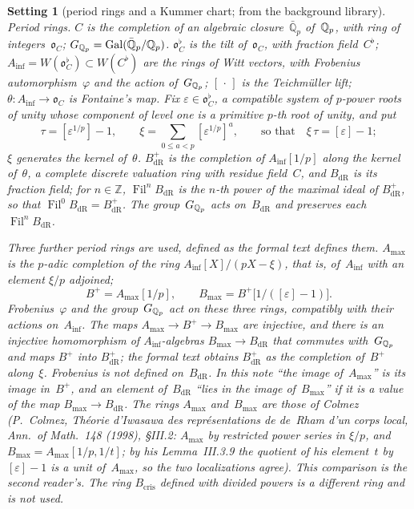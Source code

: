 \documentclass[11pt,a4paper]{article}
\newcommand{\m}[1]{\mbox{$#1$}}        %
\theoremstyle{plainx}
\theoremstyle{uprightx}
\newtheorem{setting}[theorem]{Setting}          %
\providecommand{\Ainf}{A_{\inf}}\providecommand{\WC}{W(C^{\flat})}\providecommand{\BdR}{B_{\mathrm{dR}}}
\providecommand{\Fil}{\operatorname{Fil}}\providecommand{\fS}{\mathfrak{S}}\providecommand{\cE}{\mathcal{E}}
\begin{document}
\begin{setting}[period rings and a Kummer chart; from the background library]\label{set:rings}
\emph{Period rings.} $C$ is the completion of an algebraic closure~$\bar{\mathbb{Q}}_p$ of~$\mathbb{Q}_p$, with ring of
integers~$\mathfrak{o}_C$; $G_{\mathbb{Q}_p}=\mathrm{Gal}(\bar{\mathbb{Q}}_p/\mathbb{Q}_p)$. $\mathfrak{o}_C^\flat$ is the tilt
of~$\mathfrak{o}_C$, with fraction field~$C^\flat$; $\Ainf=W(\mathfrak{o}_C^\flat)\subset\WC$ are the rings of Witt
vectors, with Frobenius automorphism~$\varphi$ and the action of~$G_{\mathbb{Q}_p}$; $[\,\cdot\,]$ is the Teichmüller lift;
$\theta\colon\Ainf\to\mathfrak{o}_C$ is Fontaine's map. Fix $\varepsilon\in\mathfrak{o}_C^\flat$, a compatible
system of $p$-power roots of unity whose component of level one is a primitive $p$-th root of unity, and put
\[\tau=[\varepsilon^{1/p}]-1,\qquad \xi=\sum_{0\le a<p}[\varepsilon^{1/p}]^{a},\qquad\text{so that}\quad
\xi\,\tau=[\varepsilon]-1 ;\]
$\xi$ generates the kernel of~$\theta$. $B^+_{\mathrm{dR}}$ is the completion of \m{\Ainf[1/p]} along the kernel
of~$\theta$, a complete discrete valuation ring with residue field~$C$, and $\BdR$ is its fraction field; for
\m{n\in\mathbb{Z}}, \m{\Fil^{n}\BdR} is the $n$-th power of the maximal ideal of $B^+_{\mathrm{dR}}$, so that
\m{\Fil^{0}\BdR=B^+_{\mathrm{dR}}}. The group~$G_{\mathbb{Q}_p}$ acts on~$\BdR$ and preserves each \m{\Fil^{n}\BdR}.

Three further period rings are used, defined as the formal text defines them. $A_{\max}$ is the $p$-adic
completion of the ring \m{\Ainf[X]/(pX-\xi)}, that is, of~$\Ainf$ with an element \m{\xi/p} adjoined;
\[B^{+}=A_{\max}[1/p],\qquad B_{\max}=B^{+}\bigl[1/([\varepsilon]-1)\bigr].\]
Frobenius~$\varphi$ and the group~$G_{\mathbb{Q}_p}$ act on these three rings, compatibly with their actions on~$\Ainf$.
The maps \m{A_{\max}\to B^{+}\to B_{\max}} are injective, and there is an injective homomorphism of
$\Ainf$-algebras \m{B_{\max}\to\BdR} that commutes with~$G_{\mathbb{Q}_p}$ and maps \m{B^{+}} into
\m{B^{+}_{\mathrm{dR}}}; the formal text obtains \m{B^{+}_{\mathrm{dR}}} as the completion of~\m{B^{+}}
along~$\xi$. Frobenius is not defined on~$\BdR$. In this note ``the image of~$A_{\max}$'' is its image
in~\m{B^{+}}, and an element of~$\BdR$ ``lies in the image of~$B_{\max}$'' if it is a value of the map
\m{B_{\max}\to\BdR}. The rings $A_{\max}$ and~$B_{\max}$ are those of Colmez (P.~Colmez,
\emph{Théorie d'Iwasawa des représentations de de~Rham d'un corps local}, Ann.\ of Math.~148 (1998), §III.2:
$A_{\max}$ by restricted power series in \m{\xi/p}, and \m{B_{\max}=A_{\max}[1/p,1/t]}; by his
Lemma~III.3.9 the quotient of his element~$t$ by \m{[\varepsilon]-1} is a unit of~$A_{\max}$, so the two
localizations agree). This comparison is the second reader's. The ring $B_{\mathrm{cris}}$ defined with divided
powers is a different ring and is not used.


\end{setting}
\end{document}
